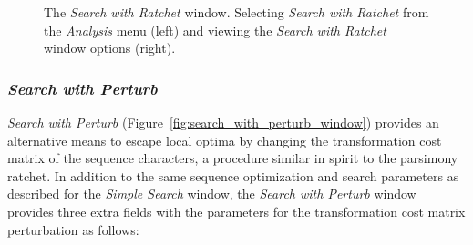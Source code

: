 {\begin{figure}
\begin{minipage}[c]{0.52\textwidth}
\end{minipage}

\caption{The \emph{Search with Ratchet} window. Selecting \emph{Search 
with Ratchet} from the \emph{Analysis}  menu (left) and viewing the 
\emph{Search with Ratchet} window options (right).}
\label{fig:search_with_ratchet_window}
\end{figure}

\subsubsection*{\emph{Search with Perturb}}

\emph{Search with Perturb} (Figure~\ref{fig:search_with_perturb_window})
provides an alternative means to escape local optima by changing
the transformation cost matrix of the sequence characters, a procedure
similar in spirit to the parsimony ratchet. In addition to the same
sequence optimization and search parameters as described for the
\emph{Simple Search} window, the \emph{Search with Perturb} window
provides three extra fields with the parameters for the transformation
cost matrix perturbation as follows:

}
